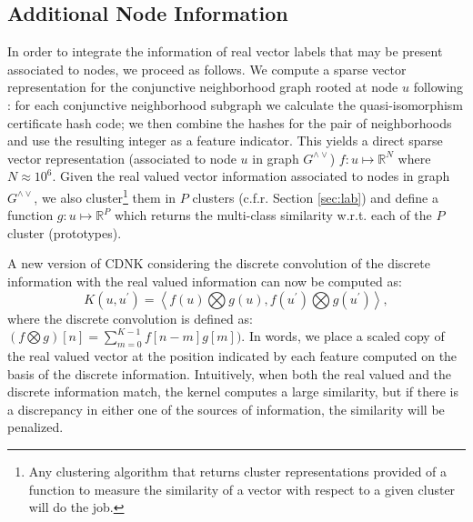 \documentclass[review]{elsarticle}
\begin{document}
\subsection{Additional Node Information}
In order to integrate the information of real vector labels that may be present associated to nodes, we proceed as follows. We compute a sparse vector representation for the conjunctive neighborhood graph rooted at node $u$ following \cite{costa2010fast}: for each conjunctive neighborhood subgraph we calculate the quasi-isomorphism certificate hash code; we then combine the hashes for the pair of neighborhoods and use the resulting integer as a feature indicator. This yields a direct sparse vector representation (associated to node $u$ in graph $G^{\wedge\vee}$) $f: u \longmapsto \mathbb{R}^N$ where $N \approx 10^6$. Given the real valued vector information associated to nodes in graph $G^{\wedge\vee}$, we also cluster\footnote{Any clustering algorithm that returns cluster representations provided of a function to measure the similarity of a vector with respect to a given cluster will do the job.} them in $P$ clusters (c.f.r. Section \ref{sec:lab}) and define a function $g: u \longmapsto \mathbb{R}^P$ which returns the multi-class similarity w.r.t. each of the $P$ cluster (prototypes). 

A new version of CDNK considering the discrete convolution of the discrete information with the real valued information can now be computed as:   
\begin{equation}
K(u,u^\prime) = \left< f(u) \bigotimes g(u), f(u^\prime) \bigotimes g(u^\prime) \right>,
\end{equation}
where the discrete convolution is defined as: 
$(f \bigotimes g)[n]=\sum _{m=0}^{K-1}f[n-m]g[m])$.
In words, we place a scaled copy of the real valued vector at the position indicated by each feature computed on the basis of the discrete information. Intuitively, when both the real valued and the discrete information match, the kernel computes a large similarity, but if there is a discrepancy in either one of the sources of information, the similarity will be penalized. 
\end{document}
